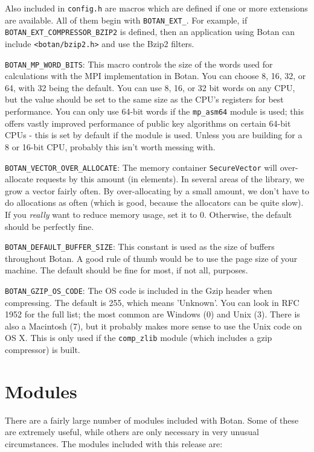 \documentclass{article}
\newcommand{\filename}[1]{\texttt{#1}}
\newcommand{\module}[1]{\texttt{#1}}
\newcommand{\type}[1]{\texttt{#1}}
\newcommand{\macro}[1]{\texttt{#1}}
\begin{document}
Also included in \filename{config.h} are macros which are defined if one or
more extensions are available. All of them begin with \verb|BOTAN_EXT_|. For
example, if \verb|BOTAN_EXT_COMPRESSOR_BZIP2| is defined, then an application
using Botan can include \filename{<botan/bzip2.h>} and use the Bzip2 filters.

\macro{BOTAN\_MP\_WORD\_BITS}: This macro controls the size of the words used
for calculations with the MPI implementation in Botan. You can choose 8, 16,
32, or 64, with 32 being the default.  You can use 8, 16, or 32 bit words on
any CPU, but the value should be set to the same size as the CPU's registers
for best performance. You can only use 64-bit words if the \module{mp\_asm64}
module is used; this offers vastly improved performance of public key
algorithms on certain 64-bit CPUs - this is set by default if the module is
used. Unless you are building for a 8 or 16-bit CPU, probably this isn't worth
messing with.

\macro{BOTAN\_VECTOR\_OVER\_ALLOCATE}: The memory container
\type{SecureVector} will over-allocate requests by this amount (in
elements). In several areas of the library, we grow a vector fairly often. By
over-allocating by a small amount, we don't have to do allocations as often
(which is good, because the allocators can be quite slow). If you \emph{really}
want to reduce memory usage, set it to 0. Otherwise, the default should be
perfectly fine.

\macro{BOTAN\_DEFAULT\_BUFFER\_SIZE}: This constant is used as the size of
buffers throughout Botan. A good rule of thumb would be to use the page size of
your machine. The default should be fine for most, if not all, purposes.

\macro{BOTAN\_GZIP\_OS\_CODE}: The OS code is included in the Gzip header when
compressing. The default is 255, which means 'Unknown'. You can look in RFC
1952 for the full list; the most common are Windows (0) and Unix (3). There is
also a Macintosh (7), but it probably makes more sense to use the Unix code on
OS X. This is only used if the \texttt{comp\_zlib} module (which includes a
gzip compressor) is built.

\pagebreak

\section{Modules}

There are a fairly large number of modules included with Botan. Some of these
are extremely useful, while others are only necessary in very unusual
circumstances. The modules included with this release are:
\end{document}
